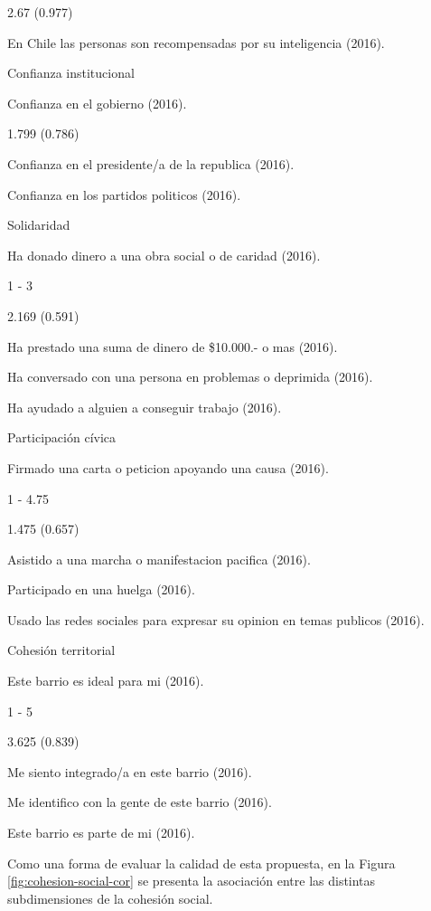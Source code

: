 \documentclass[
  12pt,
]{book}
\begin{document}
2.67 (0.977)

En Chile las personas son recompensadas por su inteligencia (2016).

Confianza institucional

Confianza en el gobierno (2016).

1.799 (0.786)

Confianza en el presidente/a de la republica (2016).

Confianza en los partidos politicos (2016).

Solidaridad

Ha donado dinero a una obra social o de caridad (2016).

1 - 3

2.169 (0.591)

Ha prestado una suma de dinero de \$10.000.- o mas (2016).

Ha conversado con una persona en problemas o deprimida (2016).

Ha ayudado a alguien a conseguir trabajo (2016).

Participación cívica

Firmado una carta o peticion apoyando una causa (2016).

1 - 4.75

1.475 (0.657)

Asistido a una marcha o manifestacion pacifica (2016).

Participado en una huelga (2016).

Usado las redes sociales para expresar su opinion en temas publicos (2016).

Cohesión territorial

Este barrio es ideal para mi (2016).

1 - 5

3.625 (0.839)

Me siento integrado/a en este barrio (2016).

Me identifico con la gente de este barrio (2016).

Este barrio es parte de mi (2016).

Como una forma de evaluar la calidad de esta propuesta, en la Figura \ref{fig:cohesion-social-cor} se presenta la asociación entre las distintas subdimensiones de la cohesión social.
\end{document}
